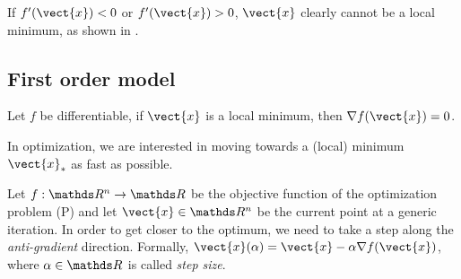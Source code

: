\documentclass[computationalMathematics.tex]{subfiles}
\begin{document}
If $f'(\vect{x}) < 0$ or $f'(\vect{x}) > 0$, $\vect{x}$ clearly cannot be a local minimum, as shown in .

\subsection{First order model}


\begin{proposition}
Let $f$ be differentiable, if $\vect{x}$ is a local minimum, then $\nabla f(\vect{x}) = 0$.
\end{proposition}

In optimization, we are interested in moving towards a (local) minimum $\vect{x}_*$ as fast as possible.

\begin{proposition}\label{prop:step_dir}
	Let $f: \R^n \to \R$ be the objective function of the optimization problem (P) and let $\vect{x} \in \R^n$ be the current point at a generic iteration.
	In order to get closer to the optimum, we need to take a step along the \emph{anti-gradient} direction.
	Formally, $\vect{x}(\alpha) = \vect{x} - \alpha \nabla f(\vect{x})$, where $\alpha \in \R$ is called \emph{step size}.
\end{proposition}
\end{document}
